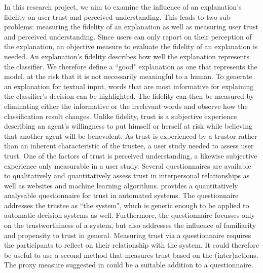 In this research project, we aim to examine the influence of an explanation's fidelity on user trust and perceived understanding. This leads to two sub-problems: measuring the fidelity of an explanation as well as measuring user trust and perceived understanding.\newline
Since users can only report on their perception of the explanation, an objective measure to evaluate the fidelity of an explanation is needed. An explanation's fidelity describes how well the explanation represents the classifier. We therefore define a ``good" explanation as one that represents the model, at the risk that it is not necessarily meaningful to a human. To generate an explanation for textual input, words that are most informative for explaining the classifier's decision can be highlighted. The fidelity can then be measured by eliminating either the informative or the irrelevant words and observe how the classification result changes. \newline
Unlike fidelity, trust is a subjective experience describing an agent's willingness to put himself or herself at risk while believing that another agent will be benevolent. As trust is experienced by a trustor rather than an inherent characteristic of the trustee, a user study needed to assess user trust. One of the factors of trust is perceived understanding, a likewise subjective experience only measurable in a user study. Several questionnaires are available to qualitatively and quantitatively assess trust in interpersonal relationships as well as websites and machine learning algorithms. \cite{korber2018theoretical} provides a quantitatively analysable questionnaire for trust in automated systems. The questionnaire addresses the trustee as ``the system", which is generic enough to be applied to automatic decision systems as well. Furthermore, the questionnaire focusses only on the trustworthiness of a system, but also addresses the influence of familiarity and propensity to trust in general. Measuring trust via a questionnaire requires the participants to reflect on their relationship with the system. It could therefore be useful to use a second method that measures trust based on the (inter)actions. The proxy measure suggested in \cite{vorm2018assessing} could be a suitable addition to a questionnaire.













